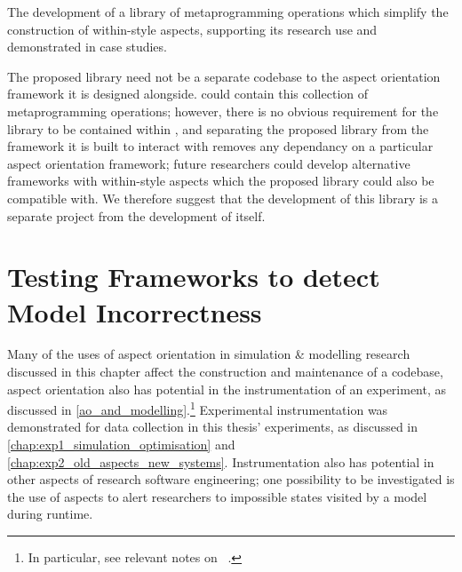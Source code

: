 \begin{researchquestion}
    The development of a library of metaprogramming operations which simplify
    the construction of within-style aspects, supporting its research use and
    demonstrated in case studies.
\end{researchquestion}

The proposed library need not be a separate codebase to the aspect orientation
framework it is designed alongside. \pdsf{} could contain this collection of
metaprogramming operations; however, there is no obvious requirement for
the library to be contained within \pdsf{}, and separating the proposed library
from the framework it is built to interact with removes any dependancy on a
particular aspect orientation framework; future researchers could develop
alternative frameworks with within-style aspects which the proposed library
could also be compatible with. We therefore suggest that the development of this
library is a separate project from the development of \pdsf{}
itself.



\section{Testing Frameworks to detect Model Incorrectness}
\label{sciunits_for_unrealistic_states}

Many of the uses of aspect orientation in simulation \& modelling research
discussed in this chapter affect the construction and maintenance of a codebase,
aspect orientation also has potential in the instrumentation of an
experiment, as discussed in \cref{ao_and_modelling}.\footnote{In particular,  
see relevant notes on ~\cite{gulyas1999use}.}
Experimental instrumentation was demonstrated for data collection in this
thesis' experiments, as discussed in \cref{chap:exp1_simulation_optimisation}
and \cref{chap:exp2_old_aspects_new_systems}. Instrumentation also
has potential in other aspects of research software engineering; one possibility
to be investigated is the use of aspects to alert researchers to impossible
states visited by a model during runtime.

